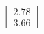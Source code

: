 \documentclass[preview]{standalone}
\begin{document}
\begin{align*}
\begin{bmatrix} 2.78 \\ 3.66 \end{bmatrix}
\end{align*}
\end{document}

